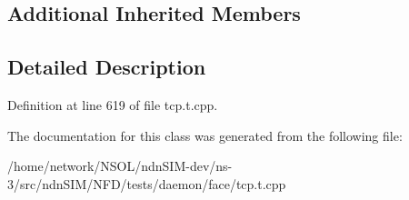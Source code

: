 \subsection*{Additional Inherited Members}


\subsection{Detailed Description}


Definition at line 619 of file tcp.\+t.\+cpp.



The documentation for this class was generated from the following file\+:\begin{DoxyCompactItemize}
\item 
/home/network/\+N\+S\+O\+L/ndn\+S\+I\+M-\/dev/ns-\/3/src/ndn\+S\+I\+M/\+N\+F\+D/tests/daemon/face/tcp.\+t.\+cpp\end{DoxyCompactItemize}

